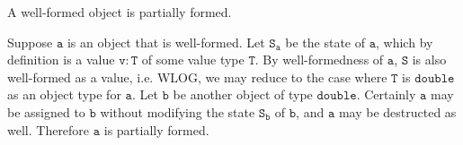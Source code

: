 \begin{Lemma}
    A well-formed object is partially formed.
\end{Lemma}

\begin{solution}
    Suppose $\mathtt{a}$ is an object that is well-formed. Let $\mathtt{S_{a}}$ 
    be the state of $\mathtt{a}$, which by definition is a value $\mathtt{v} : 
    \mathtt{T}$ of some value type $\mathtt{T}$. By well-formedness of 
    $\mathtt{a}$, $\mathtt{S}$ is also well-formed as a value, i.e. WLOG, 
    we may reduce to the case where $\mathtt{T}$ is $\mathtt{double}$ as an object type 
    for $\mathtt{a}$. Let $\mathtt{b}$ be another object of type $\mathtt{double}$. 
    Certainly $\mathtt{a}$ may be assigned to $\mathtt{b}$ without modifying the 
    state $\mathtt{S_{b}}$ of $\mathtt{b}$, and $\mathtt{a}$ may be destructed as well. 
    Therefore $\mathtt{a}$ is partially formed.
\end{solution}